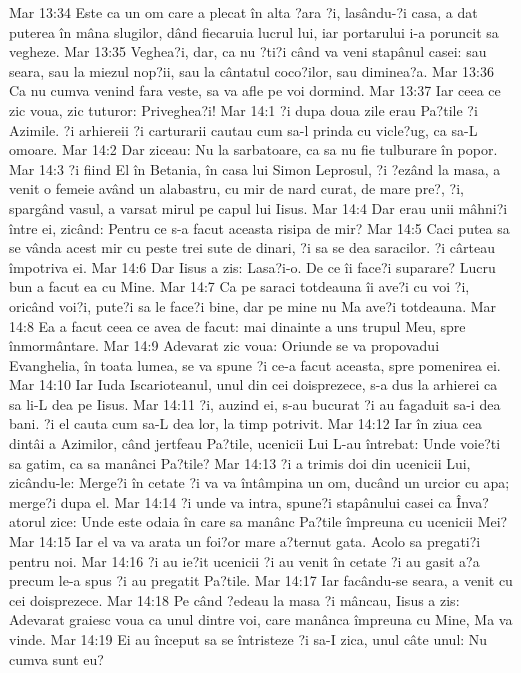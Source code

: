 Mar 13:34  Este ca un om care a plecat în alta ?ara ?i, lasându-?i casa, a dat puterea în mâna slugilor, dând fiecaruia lucrul lui, iar portarului i-a poruncit sa vegheze.
Mar 13:35  Veghea?i, dar, ca nu ?ti?i când va veni stapânul casei: sau seara, sau la miezul nop?ii, sau la cântatul coco?ilor, sau diminea?a.
Mar 13:36  Ca nu cumva venind fara veste, sa va afle pe voi dormind.
Mar 13:37  Iar ceea ce zic voua, zic tuturor: Priveghea?i!
Mar 14:1  ?i dupa doua zile erau Pa?tile ?i Azimile. ?i arhiereii ?i carturarii cautau cum sa-l prinda cu vicle?ug, ca sa-L omoare.
Mar 14:2  Dar ziceau: Nu la sarbatoare, ca sa nu fie tulburare în popor.
Mar 14:3  ?i fiind El în Betania, în casa lui Simon Leprosul, ?i ?ezând la masa, a venit o femeie având un alabastru, cu mir de nard curat, de mare pre?, ?i, spargând vasul, a varsat mirul pe capul lui Iisus.
Mar 14:4  Dar erau unii mâhni?i între ei, zicând: Pentru ce s-a facut aceasta risipa de mir?
Mar 14:5  Caci putea sa se vânda acest mir cu peste trei sute de dinari, ?i sa se dea saracilor. ?i cârteau împotriva ei.
Mar 14:6  Dar Iisus a zis: Lasa?i-o. De ce îi face?i suparare? Lucru bun a facut ea cu Mine.
Mar 14:7  Ca pe saraci totdeauna îi ave?i cu voi ?i, oricând voi?i, pute?i sa le face?i bine, dar pe mine nu Ma ave?i totdeauna.
Mar 14:8  Ea a facut ceea ce avea de facut: mai dinainte a uns trupul Meu, spre înmormântare.
Mar 14:9  Adevarat zic voua: Oriunde se va propovadui Evanghelia, în toata lumea, se va spune ?i ce-a facut aceasta, spre pomenirea ei.
Mar 14:10  Iar Iuda Iscarioteanul, unul din cei doisprezece, s-a dus la arhierei ca sa li-L dea pe Iisus.
Mar 14:11  ?i, auzind ei, s-au bucurat ?i au fagaduit sa-i dea bani. ?i el cauta cum sa-L dea lor, la timp potrivit.
Mar 14:12  Iar în ziua cea dintâi a Azimilor, când jertfeau Pa?tile, ucenicii Lui L-au întrebat: Unde voie?ti sa gatim, ca sa manânci Pa?tile?
Mar 14:13  ?i a trimis doi din ucenicii Lui, zicându-le: Merge?i în cetate ?i va va întâmpina un om, ducând un urcior cu apa; merge?i dupa el.
Mar 14:14  ?i unde va intra, spune?i stapânului casei ca Înva?atorul zice: Unde este odaia în care sa manânc Pa?tile împreuna cu ucenicii Mei?
Mar 14:15  Iar el va va arata un foi?or mare a?ternut gata. Acolo sa pregati?i pentru noi.
Mar 14:16  ?i au ie?it ucenicii ?i au venit în cetate ?i au gasit a?a precum le-a spus ?i au pregatit Pa?tile.
Mar 14:17  Iar facându-se seara, a venit cu cei doisprezece.
Mar 14:18  Pe când ?edeau la masa ?i mâncau, Iisus a zis: Adevarat graiesc voua ca unul dintre voi, care manânca împreuna cu Mine, Ma va vinde.
Mar 14:19  Ei au început sa se întristeze ?i sa-I zica, unul câte unul: Nu cumva sunt eu?
